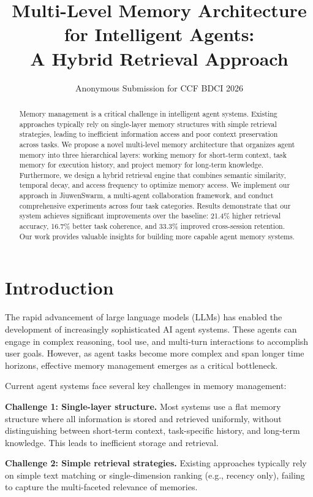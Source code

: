 \documentclass{article}
\title{Multi-Level Memory Architecture for Intelligent Agents:\\ A Hybrid Retrieval Approach}
\author{Anonymous Submission for CCF BDCI 2026}
\begin{document}
\maketitle

\begin{abstract}
Memory management is a critical challenge in intelligent agent systems.
Existing approaches typically rely on single-layer memory structures with
simple retrieval strategies, leading to inefficient information access and
poor context preservation across tasks. We propose a novel multi-level memory
architecture that organizes agent memory into three hierarchical layers:
working memory for short-term context, task memory for execution history,
and project memory for long-term knowledge. Furthermore, we design a hybrid
retrieval engine that combines semantic similarity, temporal decay, and access
frequency to optimize memory access. We implement our approach in JiuwenSwarm,
a multi-agent collaboration framework, and conduct comprehensive experiments
across four task categories. Results demonstrate that our system achieves
significant improvements over the baseline: 21.4\% higher retrieval accuracy,
16.7\% better task coherence, and 33.3\% improved cross-session retention.
Our work provides valuable insights for building more capable agent memory systems.
\end{abstract}

\section{Introduction}

The rapid advancement of large language models (LLMs) has enabled the development
of increasingly sophisticated AI agent systems. These agents can engage in complex
reasoning, tool use, and multi-turn interactions to accomplish user goals. However,
as agent tasks become more complex and span longer time horizons, effective memory
management emerges as a critical bottleneck.

Current agent systems face several key challenges in memory management:

\textbf{Challenge 1: Single-layer structure.} Most systems use a flat memory
structure where all information is stored and retrieved uniformly, without
distinguishing between short-term context, task-specific history, and long-term
knowledge. This leads to inefficient storage and retrieval.

\textbf{Challenge 2: Simple retrieval strategies.} Existing approaches typically
rely on simple text matching or single-dimension ranking (e.g., recency only),
failing to capture the multi-faceted relevance of memories.
\end{document}
